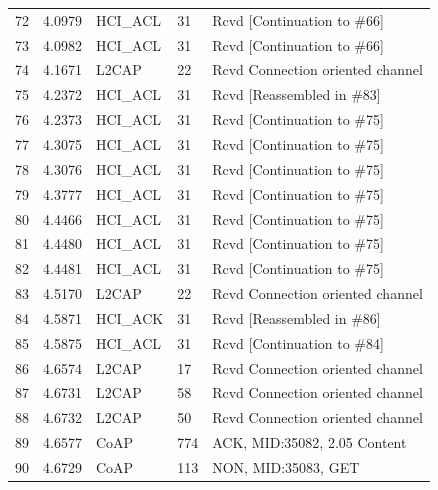 \begin{table}[H]
\begin{tabular}{lllll}
72     & 4.0979  & HCI\_ACL & 31     & Rcvd {[}Continuation to \#66{]}  \\
73     & 4.0982  & HCI\_ACL & 31     & Rcvd {[}Continuation to \#66{]}  \\
74     & 4.1671  & L2CAP    & 22     & Rcvd Connection oriented channel \\
75     & 4.2372  & HCI\_ACL & 31     & Rcvd {[}Reassembled in \#83{]}   \\
76     & 4.2373  & HCI\_ACL & 31     & Rcvd {[}Continuation to \#75{]}  \\
77     & 4.3075  & HCI\_ACL & 31     & Rcvd {[}Continuation to \#75{]}  \\
78     & 4.3076  & HCI\_ACL & 31     & Rcvd {[}Continuation to \#75{]}  \\
79     & 4.3777  & HCI\_ACL & 31     & Rcvd {[}Continuation to \#75{]}  \\
80     & 4.4466  & HCI\_ACL & 31     & Rcvd {[}Continuation to \#75{]}  \\
81     & 4.4480  & HCI\_ACL & 31     & Rcvd {[}Continuation to \#75{]}  \\
82     & 4.4481  & HCI\_ACL & 31     & Rcvd {[}Continuation to \#75{]}  \\
83     & 4.5170  & L2CAP    & 22     & Rcvd Connection oriented channel \\
84     & 4.5871  & HCI\_ACK & 31     & Rcvd {[}Reassembled in \#86{]}   \\
85     & 4.5875  & HCI\_ACL & 31     & Rcvd {[}Continuation to \#84{]}  \\
86     & 4.6574  & L2CAP    & 17     & Rcvd Connection oriented channel \\
87     & 4.6731  & L2CAP    & 58     & Rcvd Connection oriented channel \\
88     & 4.6732  & L2CAP    & 50     & Rcvd Connection oriented channel \\
89     & 4.6577  & CoAP     & 774    & ACK, MID:35082, 2.05 Content     \\
90     & 4.6729  & CoAP     & 113    & NON, MID:35083, GET              \\ \hline
\end{tabular}
\end{table}


\newpage

